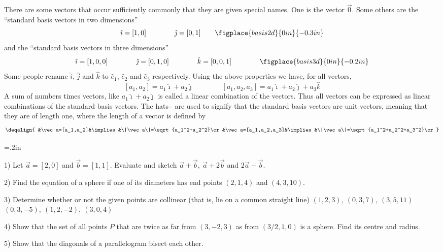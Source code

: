 There are some vectors that occur sufficiently commonly that they are
given special names. One is the vector $\vec 0$. Some others are the 
``standard basis vectors in two dimensions''
$$
\hat \imath = [1,0]\qquad\qquad\hat \jmath =[0,1]\qquad
\smash{\figplace{basis2d}{0 in}{-0.3 in}}
$$ 
and the ``standard basis vectors in three dimensions''
$$
\hat \imath = [1,0,0]\qquad\qquad\hat \jmath =[0,1,0]
\qquad\qquad\hat k =[0,0,1]\qquad\qquad
\smash{\figplace{basis3d}{0 in}{-0.2 in}}
$$ 
Some people rename $\hat i$, $\hat j$ and $\hat k$ to $\hat e_1$, $\hat
e_2$ and $\hat e_3$ respectively.
Using the above properties we have, for all vectors,
$$
[a_1,a_2]=a_1\hat\imath+a_2\hat\jmath\qquad\qquad
[a_1,a_2,a_3]=a_1\hat\imath+a_2\hat\jmath+a_3\hat k
$$
A sum of numbers times vectors, like $a_1\hat\imath+a_2\hat\jmath$ is called
a linear combination of the vectors.
Thus all vectors can be expressed as linear combinations of the standard
basis vectors. The hats $\hat{\ }$ are used to signify that the standard
basis vectors are unit vectors, meaning that they are of length one,
where the length of a vector is defined by
$$\deqalign{
&\vec a=[a_1,a_2]&\implies &\|\vec a\|=\sqrt{a_1^2+a_2^2}\cr
&\vec a=[a_1,a_2,a_3]&\implies &\|\vec a\|=\sqrt{a_1^2+a_2^2+a_3^2}\cr
}$$
{\parindent=.2in
\item{1)} Let $\vec a=[2,0]$ and $\vec b=[1,1]$. Evaluate and sketch
$\vec a+\vec b,\ \vec a+2\vec b$ and $2\vec a-\vec b$.
\smallskip
\item{2)} Find the equation of a sphere if one of its diameters has end
points $(2,1,4)$ and $(4,3,10)$.
\smallskip
\item{3)} Determine whether or not the given points are collinear (that is, lie on a common
straight line)
 $(1,2,3),\ (0,3,7),\ (3,5,11)$
 $(0,3,-5),\ (1,2,-2),\ (3,0,4)$
\smallskip
\item{4)} Show that the set of all points $P$ that are twice as far from
$(3,-2,3)$ as from $(3/2,1,0)$ is a sphere. Find its centre and radius.
\smallskip
\item{5)} Show that the diagonals of a parallelogram bisect each other.
}

